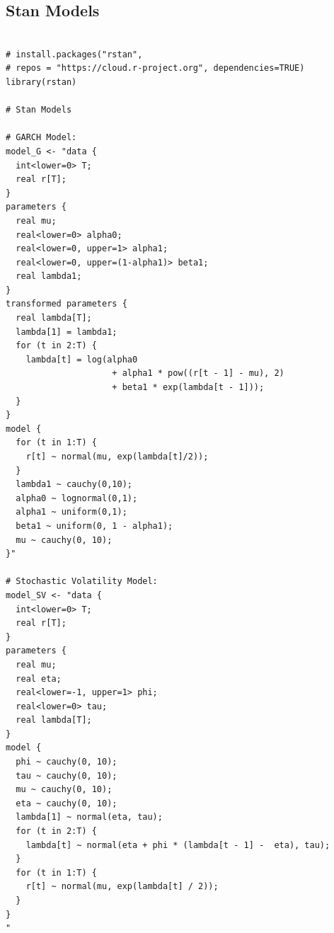 \documentclass[12pt,letterpaper,reqno,fleqn]{article}
\begin{document}
\subsection{Stan Models}
\begin{verbatim}

# install.packages("rstan", 
# repos = "https://cloud.r-project.org", dependencies=TRUE)
library(rstan)

# Stan Models

# GARCH Model:
model_G <- "data {
  int<lower=0> T;
  real r[T];
}
parameters {
  real mu;
  real<lower=0> alpha0;
  real<lower=0, upper=1> alpha1;
  real<lower=0, upper=(1-alpha1)> beta1;
  real lambda1;
}
transformed parameters {
  real lambda[T];
  lambda[1] = lambda1;
  for (t in 2:T) {
    lambda[t] = log(alpha0
                     + alpha1 * pow((r[t - 1] - mu), 2)
                     + beta1 * exp(lambda[t - 1]));
  }
}
model {
  for (t in 1:T) {
    r[t] ~ normal(mu, exp(lambda[t]/2));
  }
  lambda1 ~ cauchy(0,10); 
  alpha0 ~ lognormal(0,1);
  alpha1 ~ uniform(0,1);
  beta1 ~ uniform(0, 1 - alpha1);
  mu ~ cauchy(0, 10);
}"

# Stochastic Volatility Model:
model_SV <- "data {
  int<lower=0> T;   
  real r[T];      
}
parameters {
  real mu;                     
  real eta;
  real<lower=-1, upper=1> phi; 
  real<lower=0> tau;         
  real lambda[T];                
}
model {
  phi ~ cauchy(0, 10);
  tau ~ cauchy(0, 10);
  mu ~ cauchy(0, 10);
  eta ~ cauchy(0, 10);
  lambda[1] ~ normal(eta, tau);
  for (t in 2:T) {
    lambda[t] ~ normal(eta + phi * (lambda[t - 1] -  eta), tau);
  }
  for (t in 1:T) {
    r[t] ~ normal(mu, exp(lambda[t] / 2));
  }
}
"

\end{verbatim}
\end{document}
